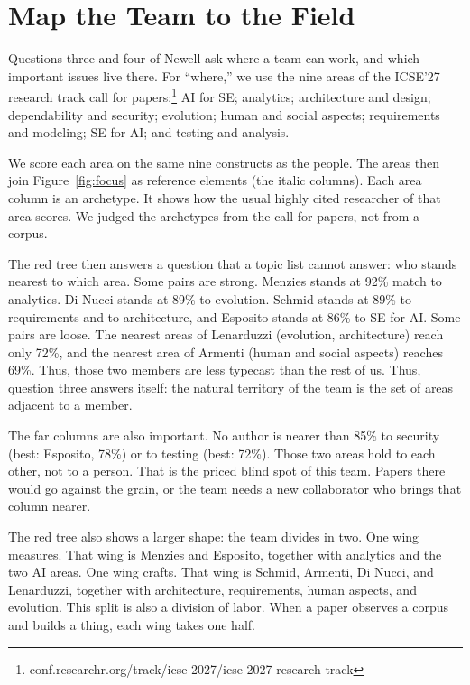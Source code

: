 \section{Map the Team to the Field}
\label{sec:map}

Questions three and four of Newell ask where a team can work, and
which important issues live there.
For ``where,'' we use the nine areas of the ICSE'27 research track
call for
papers:\footnote{conf.researchr.org/track/icse-2027/icse-2027-research-track}
AI for SE; analytics; architecture and design; dependability and
security; evolution; human and social aspects; requirements and
modeling; SE for AI; and testing and analysis.

We score each area on the same nine constructs as the people.
The areas then join Figure~\ref{fig:focus} as reference elements (the
italic columns).
Each area column is an archetype.
It shows how the usual highly cited researcher of that area scores.
We judged the archetypes from the call for papers, not from a corpus.

The red tree then answers a question that a topic list cannot answer:
who stands nearest to which area.
Some pairs are strong.
Menzies stands at 92\% match to analytics.
Di Nucci stands at 89\% to evolution.
Schmid stands at 89\% to requirements and to architecture, and
Esposito stands at 86\% to SE for AI.
Some pairs are loose.
The nearest areas of Lenarduzzi (evolution, architecture) reach only
72\%, and the nearest area of Armenti (human and social aspects)
reaches 69\%.
Thus, those two members are less typecast than the rest of us.
Thus, question three answers itself: the natural territory of the team
is the set of areas adjacent to a member.

The far columns are also important.
No author is nearer than 85\% to security (best: Esposito, 78\%) or to
testing (best: 72\%).
Those two areas hold to each other, not to a person.
That is the priced blind spot of this team.
Papers there would go against the grain, or the team needs a new
collaborator who brings that column nearer.

The red tree also shows a larger shape: the team divides in two.
One wing measures.
That wing is Menzies and Esposito, together with analytics and the two
AI areas.
One wing crafts.
That wing is Schmid, Armenti, Di Nucci, and Lenarduzzi, together with
architecture, requirements, human aspects, and evolution.
This split is also a division of labor.
When a paper observes a corpus and builds a thing, each wing takes one
half.

